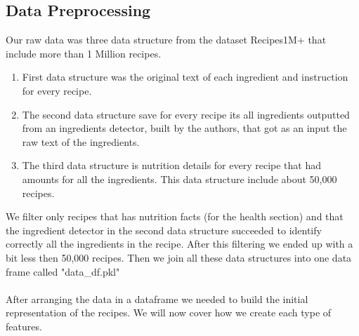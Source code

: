 \documentclass[]{article}
\begin{document}
\subsection{Data Preprocessing}
Our raw data was three data structure from the dataset Recipes1M+ that include more than 1 Million recipes.
\begin{enumerate}
	\item First data structure was the original text of each ingredient and instruction for every recipe. 
	\item The second data structure save for every recipe its all ingredients outputted from an ingredients detector, built by the authors, that got as an input the raw text of the ingredients. 
	\item The third data structure is nutrition details for every recipe that had amounts for all the ingredients. This data structure include about 50,000 recipes.
\end{enumerate}  
We filter only recipes that has nutrition facts (for the health section) and that the ingredient detector in the second data structure succeeded to identify correctly all the ingredients in the recipe. After this filtering we ended up with a bit less then 50,000 recipes. Then we join all these data structures into one data frame called "data\_df.pkl" \\\\
After arranging the data in a dataframe we needed to build the initial representation of the recipes. We will now cover how we create each type of features.
\end{document}
